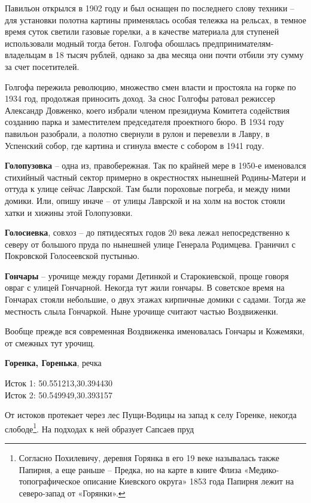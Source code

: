 Павильон открылся в 1902 году и был оснащен по последнего слову техники – для установки полотна картины применялась особая тележка на рельсах, в темное время суток светили газовые горелки, а в качестве материала для ступеней использовали модный тогда бетон. Голгофа обошлась предпринимателям-владельцам в 18 тысяч рублей, однако за два месяца они почти отбили эту сумму за счет посетителей.

Голгофа пережила революцию, множество смен власти и простояла на горке по 1934 год, продолжая приносить доход. За снос Голгофы ратовал режиссер Александр Довженко, коего избрали членом президиума Комитета содействия созданию парка и заместителем председателя проектного бюро. В 1934 году павильон разобрали, а полотно свернули в рулон и перевезли в Лавру, в Успенский собор, где картина и сгинула вместе с собором в 1941 году.\\

\medskip

\textbf{Голопузовка} – одна из, правобережная. Так по крайней мере в 1950-е именовался стихийный частный сектор примерно в окрестностях нынешней Родины-Матери и оттуда к улице сейчас Лаврской.
Там были пороховые погреба, и между ними домики. Или, опишу иначе – от улицы Лаврской и на холм на восток стояли хатки и хижины этой Голопузовки.\\

\medskip

\textbf{Голосиевка}, совхоз – до пятидесятых годов 20 века лежал непосредственно к северу от большого пруда по нынешней улице Генерала Родимцева. Граничил с Покровской Голосеевской пустынью.\\

\medskip

\textbf{Гончары} – урочище между горами Детинкой и Старокиевской, проще говоря овраг с улицей Гончарной. Некогда тут жили гончары. В советское время на Гончарах стояли небольшие, о двух этажах кирпичные домики с садами. Тогда же местность слыла Гончаркой. Ныне урочище считают частью Воздвиженки.

Вообще прежде вся современная Воздвиженка именовалась Гончары и Кожемяки, от смежных тут урочищ.\\

\medskip

\textbf{Горенка, Горенька}, речка

\parbox{\linewidth}{%
Исток 1: 50.551213,30.394430\\
Исток 2: 50.549949,30.393157
}

От истоков протекает через лес Пущи-Водицы на запад к селу Горенке, некогда слободе\footnote{Согласно Похилевичу, деревня Горянка в его 19 веке называлась также Папирня, а еще раньше – Предка, но на карте в книге Флиза «Медико-топографическое описание Киевского округа» 1853 года Папирня лежит на северо-запад от «Горянки».}. На подходах к ней образует Сапсаев пруд

